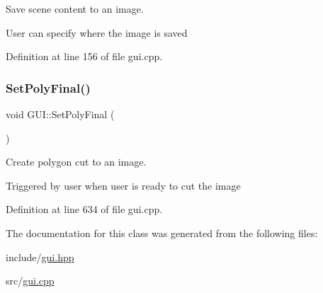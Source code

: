 Save scene content to an image. 

User can specify where the image is saved 

Definition at line 156 of file gui.\+cpp.

\mbox{\label{classGUI_a6bf2d3ef382340365b5693245a2bd955}} 
\subsubsection{\texorpdfstring{Set\+Poly\+Final()}{SetPolyFinal()}}
{\footnotesize\ttfamily void G\+U\+I\+::\+Set\+Poly\+Final (\begin{DoxyParamCaption}{ }\end{DoxyParamCaption})}



Create polygon cut to an image. 

Triggered by user when user is ready to cut the image 

Definition at line 634 of file gui.\+cpp.



The documentation for this class was generated from the following files\+:\begin{DoxyCompactItemize}
\item 
include/\mbox{\hyperlink{gui_8hpp}{gui.\+hpp}}\item 
src/\mbox{\hyperlink{gui_8cpp}{gui.\+cpp}}\end{DoxyCompactItemize}
